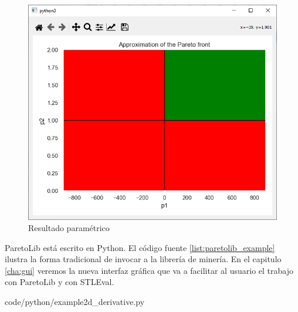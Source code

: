 \begin{figure}[htb]
\centering
  \includegraphics[width=0.7\linewidth]{images/stl_parametrico} 
\caption{Resultado paramétrico}
\label{fig:param}
\end{figure}


ParetoLib está escrito en Python. El código fuente \ref{list:paretolib_example} ilustra la forma tradicional de invocar a la librería de minería. En el capitulo \ref{cha:gui} veremos la nueva interfaz gráfica que va a facilitar al usuario el trabajo con ParetoLib y con STLEval.



		{code/python/example2d_derivative.py}
